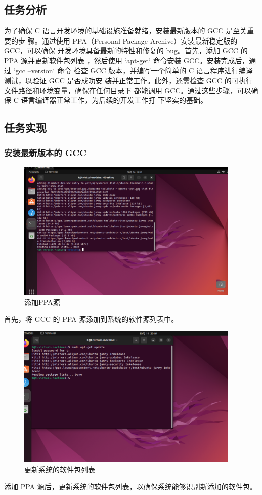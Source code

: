 \documentclass[UTF8]{ctexart}
\begin{document}
\subsection{任务分析}
为了确保 C 语言开发环境的基础设施准备就绪，安装最新版本的 GCC 是至关重要的步
骤。通过使用 PPA（Personal Package Archive）安装最新稳定版的 GCC，可以确保
开发环境具备最新的特性和修复的 bug。首先，添加 GCC 的 PPA 源并更新软件包列表
，然后使用 `apt-get` 命令安装 GCC。安装完成后，通过 `gcc --version` 命令
检查 GCC 版本，并编写一个简单的 C 语言程序进行编译测试，以验证 GCC 是否成功安
装并正常工作。此外，还需检查 GCC 的可执行文件路径和环境变量，确保在任何目录下
都能调用 GCC。通过这些步骤，可以确保 C 语言编译器正常工作，为后续的开发工作打
下坚实的基础。

\subsection{任务实现}
\subsubsection{安装最新版本的 GCC}
\begin{figure}[H]
    \centering
    \includegraphics[width=0.95\textwidth]{picture/Screenshot 2024-10-14 200009.png}
    \caption{添加PPA源}
\end{figure}
首先，将 GCC 的 PPA 源添加到系统的软件源列表中。

\begin{figure}[H]
    \centering
    \includegraphics[width=0.95\textwidth]{picture/Screenshot 2024-10-14 200417.png}
    \caption{更新系统的软件包列表}
\end{figure}
添加 PPA 源后，更新系统的软件包列表，以确保系统能够识别新添加的软件包。
\end{document}
